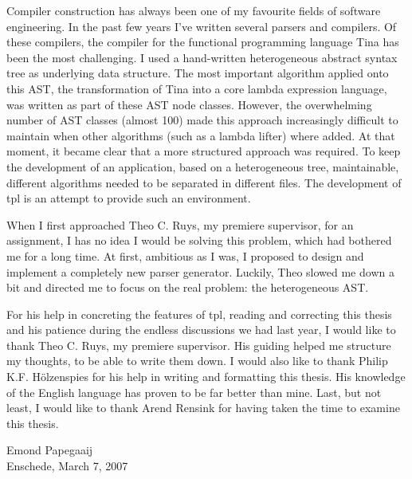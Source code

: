 
Compiler construction has always been one of my favourite fields of software
engineering. In the past few years I’ve written several parsers and compilers.
Of these compilers, the compiler for the functional programming language Tina
has been the most challenging. I used a hand-written heterogeneous abstract
syntax tree as underlying data structure. The most important algorithm applied
onto this AST, the transformation of Tina into a core lambda expression
language, was written as part of these AST node classes. However, the
overwhelming number of AST classes (almost 100) made this approach increasingly
difficult to maintain when other algorithms (such as a lambda lifter) where
added. At that moment, it became clear that a more structured approach was
required. To keep the development of an application, based on a heterogeneous
tree, maintainable, different algorithms needed to be separated in different
files. The development of tpl is an attempt to provide such an environment.

When I first approached Theo C. Ruys, my premiere supervisor, for an assignment,
I has no idea I would be solving this problem, which had bothered me for a long
time. At first, ambitious as I was, I proposed to design and implement a
completely new parser generator. Luckily, Theo slowed me down a bit and directed
me to focus on the real problem: the heterogeneous AST.

For his help in concreting the features of tpl, reading and correcting this
thesis and his patience during the endless discussions we had last year, I would
like to thank Theo C. Ruys, my premiere supervisor. His guiding helped me
structure my thoughts, to be able to write them down. I would also like to thank
Philip K.F.
H\"olzenspies for his help in writing and formatting this thesis. His knowledge
of the English language has proven to be far better than mine. Last, but not least,
I would like to thank Arend Rensink for having taken the time to examine this
thesis.

\bigskip
Emond Papegaaij\\
Enschede, March 7, 2007
\bigskip



\secup